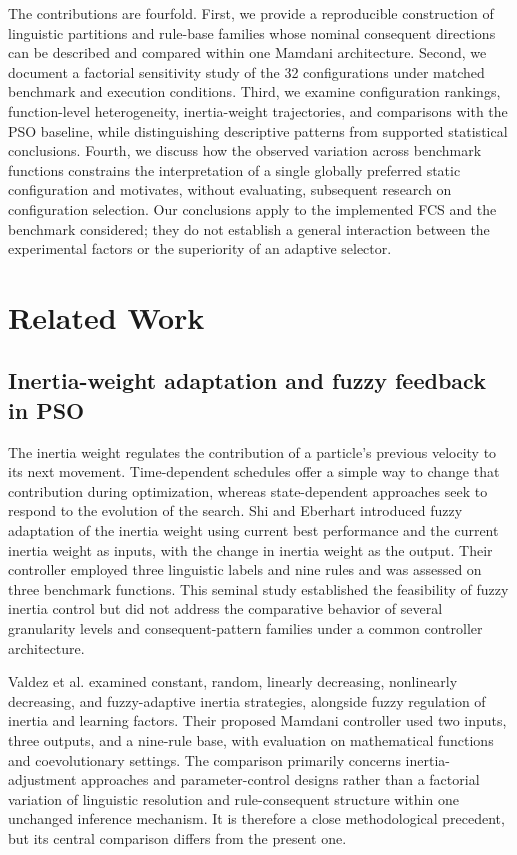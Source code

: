The contributions are fourfold. First, we provide a reproducible construction of linguistic partitions and rule-base families whose nominal consequent directions can be described and compared within one Mamdani architecture. Second, we document a factorial sensitivity study of the 32 configurations under matched benchmark and execution conditions. Third, we examine configuration rankings, function-level heterogeneity, inertia-weight trajectories, and comparisons with the PSO baseline, while distinguishing descriptive patterns from supported statistical conclusions. Fourth, we discuss how the observed variation across benchmark functions constrains the interpretation of a single globally preferred static configuration and motivates, without evaluating, subsequent research on configuration selection. Our conclusions apply to the implemented FCS and the benchmark considered; they do not establish a general interaction between the experimental factors or the superiority of an adaptive selector.

\section{Related Work}
\subsection{Inertia-weight adaptation and fuzzy feedback in PSO}
The inertia weight regulates the contribution of a particle's previous velocity to its next movement. Time-dependent schedules offer a simple way to change that contribution during optimization, whereas state-dependent approaches seek to respond to the evolution of the search. Shi and Eberhart \cite{ShiEberhart2001} introduced fuzzy adaptation of the inertia weight using current best performance and the current inertia weight as inputs, with the change in inertia weight as the output. Their controller employed three linguistic labels and nine rules and was assessed on three benchmark functions. This seminal study established the feasibility of fuzzy inertia control but did not address the comparative behavior of several granularity levels and consequent-pattern families under a common controller architecture.

Valdez et al. \cite{Valdez2017} examined constant, random, linearly decreasing, nonlinearly decreasing, and fuzzy-adaptive inertia strategies, alongside fuzzy regulation of inertia and learning factors. Their proposed Mamdani controller used two inputs, three outputs, and a nine-rule base, with evaluation on mathematical functions and coevolutionary settings. The comparison primarily concerns inertia-adjustment approaches and parameter-control designs rather than a factorial variation of linguistic resolution and rule-consequent structure within one unchanged inference mechanism. It is therefore a close methodological precedent, but its central comparison differs from the present one.

